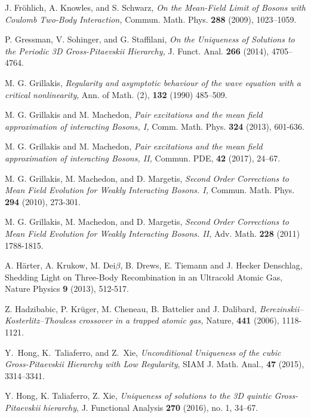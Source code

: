 \documentclass[12pt,letterpaper,leqno]{amsart}
\theoremstyle{plain}
\numberwithin{equation}{section}
\numberwithin{theorem}{section}
\numberwithin{proposition}{section}
\numberwithin{lemma}{section}
\numberwithin{corollary}{section}
\begin{document}
\begin{thebibliography}{99}
 J. Fr\"{o}hlich, A. Knowles, and S. Schwarz, \emph{On the
Mean-Field Limit of Bosons with Coulomb Two-Body Interaction, }Commun. Math.
Phys. \textbf{288} (2009), 1023--1059.

 P. Gressman, V. Sohinger, and G. Staffilani, \emph{On the
Uniqueness of Solutions to the Periodic 3D Gross-Pitaevskii Hierarchy, }J.
Funct. Anal. \textbf{266} (2014), 4705--4764.

 M. G. Grillakis, \emph{Regularity and asymptotic
behaviour of the wave equation with a critical nonlinearity}, Ann. of Math.
(2), \textbf{132} (1990) 485--509.

 M. G. Grillakis and M. Machedon, \emph{Pair excitations and
the mean field approximation of interacting Bosons, I, }Comm. Math. Phys. 
\textbf{324} (2013), 601-636.

 M. G. Grillakis and M. Machedon, \emph{Pair excitations and
the mean field approximation of interacting Bosons, II, }Commun. PDE, 
\textbf{42} (2017), 24--67.

 M. G. Grillakis, M. Machedon, and D. Margetis, \emph{Second
Order Corrections to Mean Field Evolution for Weakly Interacting Bosons. I,}
Commun. Math. Phys. \textbf{294} (2010), 273-301.

 M. G. Grillakis, M. Machedon, and D. Margetis, \emph{Second
Order Corrections to Mean Field Evolution for Weakly Interacting Bosons. II,}
Adv. Math. \textbf{228} (2011) 1788-1815.

 A. H\"{a}rter, A. Krukow, M. Dei$\beta $, B.
Drews, E. Tiemann and J. Hecker Denschlag, Shedding Light on Three-Body
Recombination in an Ultracold Atomic Gas, Nature Physics \textbf{9 }(2013),
512-517.

 Z. Hadzibabic, P. Kr\"{u}ger, M. Cheneau, B.
Battelier and J. Dalibard, \emph{Berezinskii--Kosterlitz--Thouless crossover
in a trapped atomic gas, }Nature, \textbf{441} (2006), 1118-1121.

 Y.~{Hong}, K.~{Taliaferro}, and Z.~{Xie}, \emph{%
Unconditional Uniqueness of the cubic Gross-Pitaevskii Hierarchy with Low
Regularity}, SIAM J. Math. Anal., \textbf{47} (2015), 3314--3341.

 Y. Hong, K. Taliaferro, Z. Xie, \emph{Uniqueness of solutions
to the 3D quintic Gross-Pitaevskii hierarchy}, J. Functional Analysis 
\textbf{270} (2016), no. 1, 34--67.


\end{thebibliography}
\end{document}
